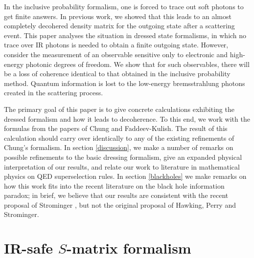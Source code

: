 \documentclass[twocolumn,prd]{revtex4}
\begin{document}
In the inclusive probability formalism, one is forced to trace out soft photons to get finite answers. In previous work, we showed that this leads to an almost completely decohered density matrix for the outgoing state after a scattering event.\cite{Carney:2017jut} This paper analyses the situation in dressed state formalisms, in which no trace over IR photons is needed to obtain a finite outgoing state. However, consider the measurement of an observable sensitive only to electronic and high-energy photonic degrees of freedom. We show that for such observables, there will be a loss of coherence identical to that obtained in the inclusive probability method. Quantum information is lost to the low-energy bremsstrahlung photons created in the scattering process.

The primary goal of this paper is to give concrete calculations exhibiting the dressed formalism and how it leads to decoherence. To this end, we work with the formulas from the papers of Chung and Faddeev-Kulish. The result of this calculation should carry over identically to any of the existing refinements of Chung's formalism. In section \ref{discussion}, we make a number of remarks on possible refinements to the basic dressing formalism, give an expanded physical interpretation of our results, and relate our work to literature in mathematical physics on QED superselection rules. In section \ref{blackholes} we make remarks on how this work fits into the recent literature on the black hole information paradox; in brief, we believe that our results are consistent with the recent proposal of Strominger \cite{Strominger:2017aeh}, but not the original proposal of Hawking, Perry and Strominger.\cite{Hawking:2016msc,Hawking:2016sgy}










\section{IR-safe $S$-matrix formalism}
\label{formalism}
\end{document}
